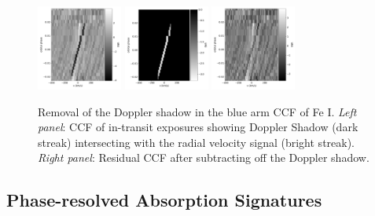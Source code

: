 \documentclass[twocolumn]{aastex631}
\begin{document}
            \begin{figure}
                \centering
                \includegraphics[width=0.25\textwidth]{plots/raw-ccf-before/KELT-20b.20190504.Fe.blue.CCFs-raw.pdf}
                \hspace{0.05\textwidth}
                \includegraphics[width=0.25\textwidth]{plots/raw-ccfs/doppler-shadow/KELT-20b.20190504.Fe.blue.DopplerShadow.pdf}
                \hspace{0.05\textwidth}
                \includegraphics[width=0.25\textwidth]{plots/raw-ccf-after/KELT-20b.20190504.Fe.blue.CCFs-raw.pdf}
                \caption{Removal of the Doppler shadow in the blue arm CCF of Fe I. \textit{Left panel}: CCF of in-transit exposures showing Doppler Shadow (dark streak) intersecting with the radial velocity signal (bright streak). \textit{Right panel}: Residual CCF after subtracting off the Doppler shadow.}
                \label{fig:doppler-shadow-removal}
            \end{figure}
        
        \subsection{Phase-resolved Absorption Signatures}\label{subsec:Line Velocities}
\end{document}
